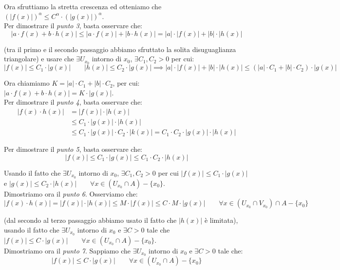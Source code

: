 \documentclass{article}
\begin{document}
\noindent Ora sfruttiamo la stretta crescenza ed otteniamo che $(|f(x)|)^\alpha \leq C^\alpha \cdot (|g(x)|)^\alpha$.\\
Per dimostrare il \textit{punto 3}, basta osservare che:
\begin{equation*}
    |a \cdot f(x) + b \cdot h(x)| \leq |a \cdot f(x)| + |b \cdot h(x)| = |a| \cdot |f(x)| + |b| \cdot |h(x)|
\end{equation*}

\noindent (tra il primo e il secondo passaggio abbiamo sfruttato la solita disuguaglianza triangolare) e usare che $\exists U_{x_0}$ intorno di $x_0$, $\exists C_1, C_2 > 0$ per cui:
\begin{equation*}
    |f(x)| \leq C_1 \cdot |g(x)| \qquad |h(x)| \leq C_2 \cdot |g(x)| \implies |a| \cdot |f(x)| + |b| \cdot |h(x)| \leq (|a| \cdot C_1 + |b| \cdot C_2) \cdot |g(x)|
\end{equation*}

\noindent Ora chiamiamo $K = |a| \cdot C_1 + |b| \cdot C_2$, per cui: $|a \cdot f(x) + b \cdot h(x)| = K \cdot |g(x)|$.\\
Per dimostrare il \textit{punto 4}, basta osservare che:
\begin{align*}
    |f(x) \cdot h(x)| &= |f(x)| \cdot |h(x)|\\
    &\leq C_1 \cdot |g(x)| \cdot |h(x)| \\
    &\leq C_1 \cdot |g(x)| \cdot C_2 \cdot |k(x)| = C_1 \cdot C_2 \cdot |g(x)| \cdot |h(x)|
\end{align*}

\noindent Per dimostrare il \textit{punto 5}, basta osservare che:
\begin{equation*}
    |f(x)| \leq C_1 \cdot |g(x)| \leq C_1 \cdot C_2 \cdot |h(x)|
\end{equation*}

\noindent Usando il fatto che $\exists U_{x_0}$ intorno di $x_0$, $\exists C_1, C_2 > 0$ per cui $|f(x)| \leq C_1 \cdot |g(x)|$ e $|g(x)| \leq C_2 \cdot |h(x)| \qquad \forall x \in (U_{x_0} \cap A) - \{x_0\}$.\\
Dimostriamo ora il \textit{punto 6}. Osserviamo che:
\begin{equation*}
    |f(x) \cdot h(x)| = |f(x)| \cdot |h(x)| \leq M \cdot |f(x)| \leq C \cdot M \cdot |g(x)| \qquad \forall x \in (U_{x_0} \cap V_{x_0}) \cap A - \{x_0\}
\end{equation*}

\noindent (dal secondo al terzo passaggio abbiamo usato il fatto che $|h(x)|$ è limitata), usando il fatto che $\exists U_{x_0}$ intorno di $x_0$ e $\exists C > 0$ tale che $|f(x)| \leq C \cdot |g(x)| \qquad \forall x \in (U_{x_0} \cap A) - \{x_0\}$.\\
Dimostriamo ora il \textit{punto 7}. Sappiamo che $\exists U_{x_0}$ intorno di $x_0$ e $\exists C > 0$ tale che:
\begin{equation*}
    |f(x)| \leq C \cdot |g(x)| \qquad \forall x \in (U_{x_0} \cap A) - \{x_0\}
\end{equation*}
\end{document}
